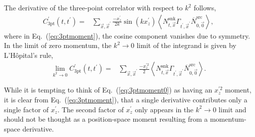 \documentclass[prd,aps,twocolumn,superscriptaddress,tightenlines,nofootinbib,floatfix,preprintnumbers,10pt]{revtex4-1}
\begin{document}
The derivative of the three-point correlator with respect to $k^2$ follows,
\begin{align}
C^\prime_{\text{3pt}}(t, t^\prime)
=& \sum_{\vec{x},\vec{x}^\prime} \frac{-x^\prime_z}{2k}\sin\left(kx^\prime_z\right) \left<N^{\mathrm{snk}}_{t,\vec{x}}\Gamma_{t^\prime,\vec{x}^\prime} \overline{N}^{\mathrm{src}}_{0,\vec{0}}\right>, 
\label{eq:3ptmoment}
\end{align}
where in Eq.~(\ref{eq:3ptmoment}), the cosine component vanishes due to symmetry. In the limit of zero momentum, the $k^2 \rightarrow 0$ limit of the integrand is given by L'H\^opital's rule,
\begin{align}
\lim_{k^2 \rightarrow 0} C^\prime_{\text{3pt}}(t, t^\prime) = & \sum_{\vec{x},\vec{x}^\prime}\frac{-x^{\prime 2}_z}{2}\left<N^{\mathrm{snk}}_{t,\vec{x}}\Gamma_{t^\prime,\vec{x}^\prime} \overline{N}^{\mathrm{src}}_{0,\vec{0}}\right>.
\label{eq:3ptmoment0}
\end{align}

While it is tempting to think of Eq.~(\ref{eq:3ptmoment0}) as having an $x^{\prime 2}_z$ moment, it is clear from Eq.~(\ref{eq:3ptmoment}), that a single derivative contributes only a single factor of $x^{\prime}_z$. The second factor of $x^{\prime}_z$ only appears in the $k^2\rightarrow 0$ limit and should not be thought as a position-space moment resulting from a momentum-space derivative.
\end{document}
